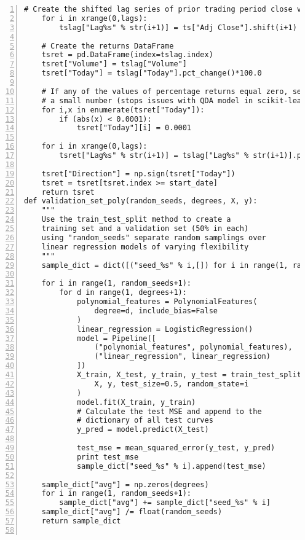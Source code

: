 \begin{lstlisting}[numbers=left, breaklines=true]
    # Create the shifted lag series of prior trading period close values
    for i in xrange(0,lags):
        tslag["Lag%s" % str(i+1)] = ts["Adj Close"].shift(i+1)

    # Create the returns DataFrame
    tsret = pd.DataFrame(index=tslag.index)
    tsret["Volume"] = tslag["Volume"]
    tsret["Today"] = tslag["Today"].pct_change()*100.0

    # If any of the values of percentage returns equal zero, set them to
    # a small number (stops issues with QDA model in scikit-learn)
    for i,x in enumerate(tsret["Today"]):
        if (abs(x) < 0.0001):
            tsret["Today"][i] = 0.0001

    for i in xrange(0,lags):
        tsret["Lag%s" % str(i+1)] = tslag["Lag%s" % str(i+1)].pct_change()*100.0

    tsret["Direction"] = np.sign(tsret["Today"])
    tsret = tsret[tsret.index >= start_date]
    return tsret
def validation_set_poly(random_seeds, degrees, X, y):
    """
    Use the train_test_split method to create a
    training set and a validation set (50% in each)
    using "random_seeds" separate random samplings over
    linear regression models of varying flexibility
    """
    sample_dict = dict([("seed_%s" % i,[]) for i in range(1, random_seeds+1)])
    
    for i in range(1, random_seeds+1):
        for d in range(1, degrees+1):
            polynomial_features = PolynomialFeatures(
                degree=d, include_bias=False
            )
            linear_regression = LogisticRegression()
            model = Pipeline([
                ("polynomial_features", polynomial_features),
                ("linear_regression", linear_regression)
            ])
            X_train, X_test, y_train, y_test = train_test_split(
                X, y, test_size=0.5, random_state=i
            )
            model.fit(X_train, y_train)
            # Calculate the test MSE and append to the
            # dictionary of all test curves
            y_pred = model.predict(X_test)
            
            test_mse = mean_squared_error(y_test, y_pred)
            print test_mse
            sample_dict["seed_%s" % i].append(test_mse)
           
    sample_dict["avg"] = np.zeros(degrees)
    for i in range(1, random_seeds+1):
        sample_dict["avg"] += sample_dict["seed_%s" % i]
    sample_dict["avg"] /= float(random_seeds)
    return sample_dict


\end{lstlisting}
